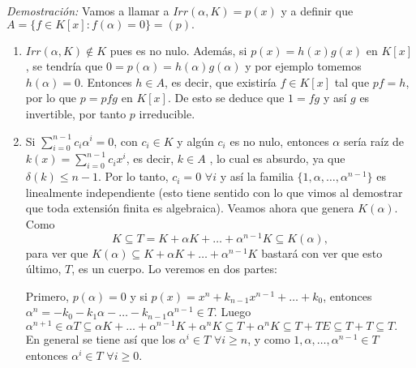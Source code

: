 \documentclass[12pt]{article}
\begin{document}
\emph{Demostración: }Vamos a llamar a  $Irr(\alpha, K) = p(x)$ y a definir que  $A = \lbrace f \in K[x] : f(\alpha) = 0\rbrace = (p).$ \begin{enumerate}
\item $Irr(\alpha, K) \notin K$ pues es no nulo. Además, si $p(x) = h(x) g(x)$ en $K[x]$, se tendría que $0 = p(\alpha) = h(\alpha) g(\alpha)$ y por ejemplo  tomemos $h(\alpha) = 0$. Entonces $h \in A$, es decir, que existiría $f \in K[x]$ tal que $pf = h$, por lo que $p = pfg$ en $K[x]$. De esto se deduce que $1 = fg$ y así $g$ es invertible, por tanto $p$ irreducible.
\item  Si $\sum_{i= 0}^{n-1}c_{i}\alpha^{i} = 0$, con $c_{i} \in K$ y algún $c_{i}$ es no nulo, entonces $\alpha$ sería raíz de $k(x) = \sum_{i = 0}^{n-1}c_{i}x^{i}$, es decir, $k \in A$ , lo cual es absurdo, ya que $\delta (k) \leq n-1.$ Por lo tanto, $c_{i} = 0$ $\forall i$ y así la familia $\lbrace 1, \alpha, \ldots, \alpha^{n-1} \rbrace$ es linealmente independiente (esto tiene sentido con lo que vimos al demostrar que toda extensión finita es algebraica). Veamos ahora que genera $K(\alpha)$. Como $$K \subseteq T = K + \alpha K + \ldots + \alpha^{n-1} K \subseteq K(\alpha),$$ para ver que $K(\alpha) \subseteq K + \alpha K + \ldots + \alpha^{n-1} K$ bastará con ver que esto último, $T$, es un cuerpo. Lo veremos en dos partes: 

Primero, $p(\alpha) = 0$ y si $p(x) = x^{n} + k_{n-1}x^{n-1} + \ldots + k_{0}$, entonces $\alpha^{n} = -k_{0} - k_{1}\alpha - \ldots - k_{n-1}\alpha^{n-1} \in T$. Luego $\alpha^{n+1} \in \alpha T \subseteq  \alpha K + \ldots + \alpha^{n-1} K + \alpha^{n} K \subseteq T + \alpha^{n} K \subseteq T + T E \subseteq T + T \subseteq T.$ En general se tiene así que los $\alpha^{i} \in T$ $\forall i \geq n$, y como $1, \alpha, \ldots, \alpha^{n-1} \in T$ entonces $\alpha^{i} \in T$ $\forall i \geq 0$.


\end{enumerate}
\end{document}
